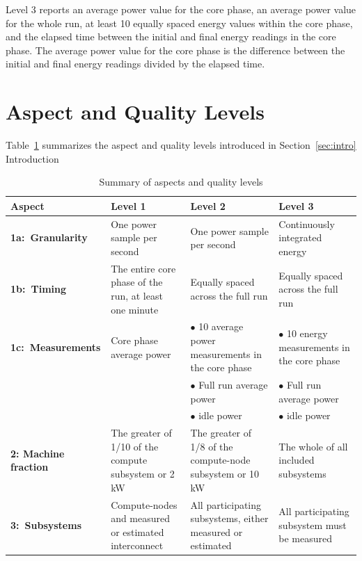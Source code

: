 \noindent
Level 3 reports an average power value for the core phase, an average power value for the whole run, at least 10 equally spaced energy values within the core phase, and the elapsed time between the initial and final energy readings in the core phase. The average power value for the core phase is the difference between the initial and final energy readings divided by the elapsed time.

\section{Aspect and Quality Levels}
\label{sec:AQLevels}
\noindent
Table~\ref{tab:levels} summarizes the aspect and quality levels introduced in Section~\ref{sec:intro} Introduction

\noindent
\begin{table}
\caption{Summary of aspects and quality levels}
\label{tab:levels}
\begin{tabular}{|p{3.0cm}|p{3.5cm}|p{3.5cm}|p{3.5cm}|} \hline
\textbf{Aspect}&\textbf{Level 1}&\textbf{Level 2}&\textbf{Level 3}\\ \hline

\textbf{1a:~Granularity} &
One power sample per second &
One power sample per second &
Continuously integrated energy\\
\hline


\textbf{1b:~Timing} &
The entire core phase of the run, at least one minute &
Equally spaced across the full run &
Equally spaced across the full run   \\
\hline

\textbf{1c:~Measurements} &
Core phase average power &
$\bullet$ 10 average power measurements in the core phase &
$\bullet$  10 energy measurements in the core phase\\

 & &
$\bullet$  Full run average power &
$\bullet$  Full run average power \\

 & &
$\bullet$  idle power &
$\bullet$  idle power \\
\hline

\textbf{2: Machine \newline fraction}  &
The greater of 1/10 of the compute subsystem or 2 kW  &
The greater of 1/8 of the compute-node subsystem or 10 kW  &
The whole of all included subsystems \\
\hline

\textbf{3:~Subsystems} &
Compute-nodes and measured or estimated interconnect &
All participating subsystems, either measured or estimated &
All participating subsystem must be measured \\
\hline


\end{tabular}
\end{table}
